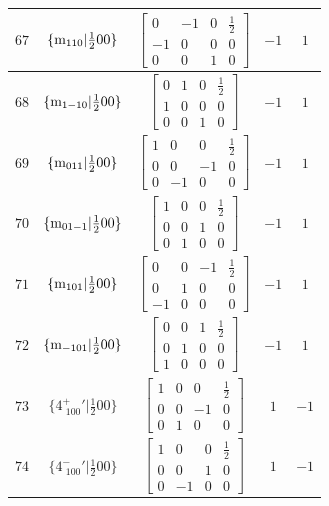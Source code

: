 \documentclass[fleqn,8pt]{jsarticle}
\begin{document}
\begin{longtable}{ccccc}
$ 67 $ & $ \{{\rm m}_{110}|\frac{1}{2} 0 0\} $ & $ \begin{bmatrix} 0 & -1 & 0 & \frac{1}{2} \\ -1 & 0 & 0 & 0 \\ 0 & 0 & 1 & 0 \end{bmatrix} $ & $ -1 $ & $ 1 $ \\ \hline
$ 68 $ & $ \{{\rm m}_{1-10}|\frac{1}{2} 0 0\} $ & $ \begin{bmatrix} 0 & 1 & 0 & \frac{1}{2} \\ 1 & 0 & 0 & 0 \\ 0 & 0 & 1 & 0 \end{bmatrix} $ & $ -1 $ & $ 1 $ \\ \hline
$ 69 $ & $ \{{\rm m}_{011}|\frac{1}{2} 0 0\} $ & $ \begin{bmatrix} 1 & 0 & 0 & \frac{1}{2} \\ 0 & 0 & -1 & 0 \\ 0 & -1 & 0 & 0 \end{bmatrix} $ & $ -1 $ & $ 1 $ \\ \hline
$ 70 $ & $ \{{\rm m}_{01-1}|\frac{1}{2} 0 0\} $ & $ \begin{bmatrix} 1 & 0 & 0 & \frac{1}{2} \\ 0 & 0 & 1 & 0 \\ 0 & 1 & 0 & 0 \end{bmatrix} $ & $ -1 $ & $ 1 $ \\ \hline
$ 71 $ & $ \{{\rm m}_{101}|\frac{1}{2} 0 0\} $ & $ \begin{bmatrix} 0 & 0 & -1 & \frac{1}{2} \\ 0 & 1 & 0 & 0 \\ -1 & 0 & 0 & 0 \end{bmatrix} $ & $ -1 $ & $ 1 $ \\ \hline
$ 72 $ & $ \{{\rm m}_{-101}|\frac{1}{2} 0 0\} $ & $ \begin{bmatrix} 0 & 0 & 1 & \frac{1}{2} \\ 0 & 1 & 0 & 0 \\ 1 & 0 & 0 & 0 \end{bmatrix} $ & $ -1 $ & $ 1 $ \\ \hline
$ 73 $ & $ \{4^{+}_{\,\,100}{}'|\frac{1}{2} 0 0\} $ & $ \begin{bmatrix} 1 & 0 & 0 & \frac{1}{2} \\ 0 & 0 & -1 & 0 \\ 0 & 1 & 0 & 0 \end{bmatrix} $ & $ 1 $ & $ -1 $ \\ \hline
$ 74 $ & $ \{4^{-}_{\,\,100}{}'|\frac{1}{2} 0 0\} $ & $ \begin{bmatrix} 1 & 0 & 0 & \frac{1}{2} \\ 0 & 0 & 1 & 0 \\ 0 & -1 & 0 & 0 \end{bmatrix} $ & $ 1 $ & $ -1 $ \\ \hline

\end{longtable}
\end{document}
